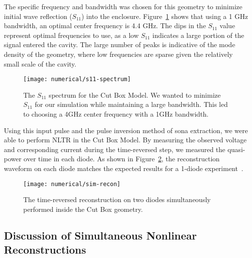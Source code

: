 The specific frequency and bandwidth was chosen for this geometry to minimize initial wave reflection ($S_{11}$) into the enclosure. Figure~\ref{fig:numerical-s11-spectrum} shows that using a 1 GHz bandwidth, an optimal center frequency is 4.4 GHz. The dips in the $S_{11}$ value represent optimal frequencies to use, as a low $S_{11}$ indicates a large portion of the signal entered the cavity. The large number of peaks is indicative of the mode density of the geometry, where low frequencies are sparse given the relatively small scale of the cavity.

\begin{figure}[t]
\centering
\texttt{[image: numerical/s11-spectrum]}
\caption[$S_{11}$ spectrum of the Cut Box Model]{The $S_{11}$ spectrum for the Cut Box Model. We wanted to minimize $S_{11}$ for our simulation while maintaining a large bandwidth. This led to choosing a 4GHz center frequency with a 1GHz bandwidth.}
\label{fig:numerical-s11-spectrum}
\end{figure}



Using this input pulse and the pulse inversion method of sona extraction, we were able to perform NLTR in the Cut Box Model. By measuring the observed voltage and corresponding current during the time-reversed step, we measured the quasi-power over time in each diode. As shown in Figure~\ref{fig:numerical-sim-recon}, the reconstruction waveform on each diode matches the expected results for a 1-diode experiment~\cite{taddese_sensing_2010,barbieri_time_2010}.
\begin{figure}[t]
\centering
\texttt{[image: numerical/sim-recon]}
\caption[Simultaneous reconstructions on two diodes]{The time-reversed reconstruction on two diodes simultaneously performed inside the Cut Box geometry.}
\label{fig:numerical-sim-recon}
\end{figure}



\subsection{Discussion of Simultaneous Nonlinear Reconstructions}

